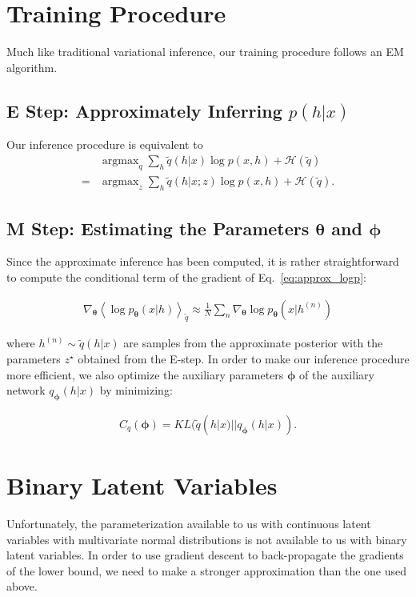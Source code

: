 \documentclass[preprint, twocolumn]{article}
\newcommand{\qexp}[1]{\left<#1\right>}
\newcommand{\vects}[1]{\boldsymbol{#1}}
\newcommand{\TT}[0]{\vects{\theta}}
\newcommand{\PP}[0]{\vects{\phi}}
\newcommand{\HH}[0]{\mathcal{H}}
\DeclareMathOperator*{\argmax}{\arg \max}
\begin{document}
\section{Training Procedure}
Much like traditional variational inference, our training procedure follows an EM algorithm.

\subsection{E Step: Approximately Inferring $p(h|x)$}
Our inference procedure is equivalent to 
\begin{align*}
    &\argmax_{q}  \sum_h \tilde{q}(h|x) \log p(x,h) + \HH(\tilde{q}) \\
    =& \argmax_{z} \sum_h \tilde{q}(h|x; z) \log p(x,h) + \HH(\tilde{q}).
\end{align*}

\subsection{M Step: Estimating the Parameters $\TT$ and $\PP$}

Since the approximate inference has been computed, it is rather straightforward
to compute the conditional term of the gradient of Eq.~\eqref{eq:approx_logp}:

\begin{align*}
    \nabla_{\TT} \qexp{\log p_{\TT}(x|h)}_{\tilde{q}} \approx \frac{1}{N} \sum_n \nabla_{\TT} \log p_{\TT}(x|h^{(n)})
\end{align*}

where $h^{(n)} \sim \tilde{q}(h|x)$ are samples from the approximate posterior with the parameters $z^{\star}$ obtained from the E-step. In order to make our inference procedure more efficient, we also optimize the auxiliary parameters $\PP$ of the auxiliary network $q_{\PP}(h|x)$ by minimizing:

\begin{align}
    \label{eq:c_q}
    C_q(\PP) = KL(\tilde{q}(h|x)||q_{\PP}(h|x)).
\end{align}

\section{Binary Latent Variables}
Unfortunately, the parameterization available to us with continuous latent variables with multivariate normal distributions is not available to us with binary latent variables. In order to use gradient descent to back-propagate the gradients of the lower bound, we need to make a stronger approximation than the one used above. 
\end{document}

